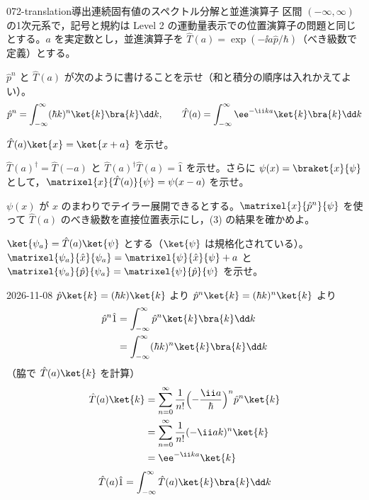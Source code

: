 \documentclass[uplatex,dvipdfmx,a4paper,11pt]{jsarticle}
\begin{document}
\begin{mondai}{072-translation}{導出}{連続固有値のスペクトル分解と並進演算子}
区間 $(-\infty,\infty)$ の1次元系で，記号と規約は Level 2 の運動量表示での位置演算子の問題と同じとする。$a$ を実定数とし，並進演算子を $\hat{T}(a)=\exp(-\ii a\hat{p}/\hbar)$（べき級数で定義）とする。
  \begin{shoumon}
    \item $\hat{p}^{n}$ と $\hat{T}(a)$ が次のように書けることを示せ（和と積分の順序は入れかえてよい）。
    \[ \hat{p}^{n}=\int_{-\infty}^{\infty}(\hbar k)^{n}\ket{k}\bra{k}\dd k,\qquad \hat{T}(a)=\int_{-\infty}^{\infty}\ee^{-\ii ka}\ket{k}\bra{k}\dd k \]
    \item $\hat{T}(a)\ket{x}=\ket{x+a}$ を示せ。
    \item $\hat{T}(a)^{\dagger}=\hat{T}(-a)$ と $\hat{T}(a)^{\dagger}\hat{T}(a)=\hat{1}$ を示せ。さらに $\psi(x)=\braket{x}{\psi}$ として，$\matrixel{x}{\hat{T}(a)}{\psi}=\psi(x-a)$ を示せ。
    \item $\psi(x)$ が $x$ のまわりでテイラー展開できるとする。$\matrixel{x}{\hat{p}^{n}}{\psi}$ を使って $\hat{T}(a)$ のべき級数を直接位置表示にし，(3) の結果を確かめよ。
    \item $\ket{\psi_{a}}=\hat{T}(a)\ket{\psi}$ とする（$\ket{\psi}$ は規格化されている）。$\matrixel{\psi_{a}}{\hat{x}}{\psi_{a}}=\matrixel{\psi}{\hat{x}}{\psi}+a$ と $\matrixel{\psi_{a}}{\hat{p}}{\psi_{a}}=\matrixel{\psi}{\hat{p}}{\psi}$ を示せ。
  \end{shoumon}
\begin{kotaeutsushi}{2026-11-08}
$\hat{p}\ket{k}=(\hbar k)\ket{k}$ より $\hat{p}^{n}\ket{k}=(\hbar k)^{n}\ket{k}$ より
\begin{align*}
\hat{p}^{n}\hat{1}&=\int_{-\infty}^{\infty}\hat{p}^{n}\ket{k}\bra{k}\dd k\\
&=\int_{-\infty}^{\infty}(\hbar k)^{n}\ket{k}\bra{k}\dd k
\end{align*}
（脇で $\hat{T}(a)\ket{k}$ を計算）
\begin{align*}
\hat{T}(a)\ket{k}&=\sum_{n=0}^{\infty}\frac{1}{n!}\Bigl(-\frac{\ii a}{\hbar}\Bigr)^{n}\hat{p}^{n}\ket{k}\\
&=\sum_{n=0}^{\infty}\frac{1}{n!}(-\ii ak)^{n}\ket{k}\\
&=\ee^{-\ii ka}\ket{k}
\end{align*}
\begin{align*}
\hat{T}(a)\hat{1}&=\int_{-\infty}^{\infty}\hat{T}(a)\ket{k}\bra{k}\dd k\\

\end{align*}
\end{kotaeutsushi}
\end{mondai}
\end{document}
